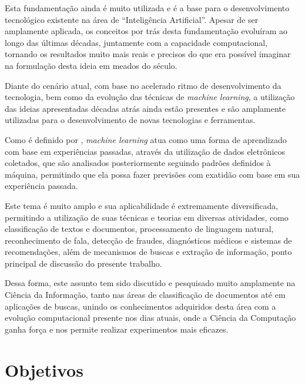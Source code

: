 Esta fundamentação ainda é muito utilizada e é a base para o desenvolvimento tecnológico existente na área de ``Inteligência Artificial''. Apesar de ser amplamente aplicada, os conceitos por trás desta fundamentação evoluíram ao longo das últimas décadas, juntamente com a capacidade computacional, tornando os resultados muito mais reais e precisos do que era possível imaginar na formulação desta ideia em meados do século.

Diante do cenário atual, com base no acelerado ritmo de desenvolvimento da tecnologia, bem como da evolução das técnicas de \textit{machine learning}, a utilização das ideias apresentadas décadas atrás ainda estão presentes e são amplamente utilizadas para o desenvolvimento de novas tecnologias e ferramentas.

Como é definido por \cite{foundations-machine-learning}, \textit{machine learning} atua como uma forma de aprendizado com base em experiências passadas, através da utilização de dados eletrônicos coletados, que são analisados posteriormente seguindo padrões definidos à máquina, permitindo que ela possa fazer previsões com exatidão com base em sua experiência passada.

Este tema é muito amplo e sua aplicabilidade é extremamente diversificada, permitindo a utilização de suas técnicas e teorias em diversas atividades, como classificação de textos e documentos, processamento de linguagem natural, reconhecimento de fala, detecção de fraudes, diagnósticos médicos e sistemas de recomendações, além de mecanismos de buscas e extração de informação, ponto principal de discussão do presente trabalho.

Dessa forma, este assunto tem sido discutido e pesquisado muito amplamente na Ciência da Informação, tanto nas áreas de classificação de documentos até em aplicações de buscas, unindo os conhecimentos adquiridos desta área com a evolução computacional presente nos dias atuais, onde a Ciência da Computação ganha força e nos permite realizar experimentos mais eficazes.

\section{Objetivos}
\label{sec:goals}


